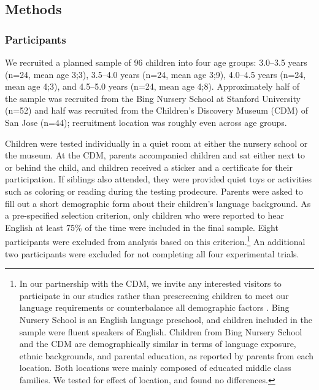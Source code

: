 \documentclass[man]{apa2}
\begin{document}

\subsection{Methods}

\subsubsection{Participants}

We recruited a planned sample of 96 children into four age groups: 3.0--3.5 years (n=24, mean age 3;3), 3.5--4.0 years (n=24, mean age 3;9), 4.0--4.5 years (n=24, mean age 4;3), and 4.5--5.0 years (n=24, mean age 4;8).  Approximately half of the sample was recruited from the Bing Nursery School at Stanford University (n=52) and half was recruited from the Children's Discovery Museum (CDM) of San Jose (n=44); recruitment location was roughly even across age groups.
  
Children were tested individually in a quiet room at either the nursery school or the museum. At the CDM, parents accompanied children and sat either next to or behind the child, and children received a sticker and a certificate for their participation. If siblings also attended, they were provided quiet toys or activities such as coloring or reading during the testing prodecure. Parents were asked to fill out a short demographic form about their children's language background. As a pre-specified selection criterion, only children who were reported to hear English at least 75\% of the time were included in the final sample.  Eight participants were excluded from analysis based on this criterion.\footnote{In our partnership with the CDM, we invite any interested visitors to participate in our studies rather than prescreening children to meet our language requirements or counterbalance all demographic factors \cite{callanan2012}. Bing Nursery School is an English language preschool, and children included in the sample were fluent speakers of English. Children from Bing Nursery School and the CDM are demographically similar in terms of language exposure, ethnic backgrounds, and parental education, as reported by parents from each location.  Both locations were mainly composed of educated middle class families.  We tested for effect of location, and found no differences.}  An additional two participants were excluded for not completing all four experimental trials. 
\end{document}
